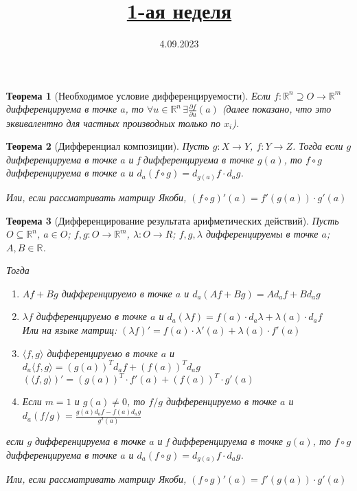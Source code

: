 \documentclass[11pt,a4paper,oneside]{scrartcl}
\title{\href{https://www.youtube.com/live/0p9G5WBcDqs?si=1_87BezxIHYyR8rZ}{1-ая неделя}}
\date{4.09.2023}
\newtheorem{theorem}{Теорема}
\begin{document}
\pagestyle{empty}

\maketitle

\begin{theorem}[Необходимое условие дифференцируемости]
    Если $f: \mathbb{R}^n \supseteq O \rightarrow \mathbb{R}^m$
    дифференцируема в точке $a$,
    то $\forall u \in \mathbb{R}^n \, \exists \frac{\partial f}{\partial u}(a)$
    (далее показано, что это эквивалентно для частных производных только по $x_i$).
\end{theorem}

\begin{theorem}[Дифференциал композиции]    %
    Пусть $g: X \rightarrow Y$, $f: Y \rightarrow Z$.
    Тогда если $g$ дифференцируема в точке $a$
    и f дифференцируема в точке $g(a)$,
    то $f \circ g$ дифференцируема в точке $a$
    и $d_a (f \circ g) = d_{g(a)} f \cdot d_a g$.

    Или, если рассматривать матрицу Якоби, $(f \circ g)'(a) = f'(g(a)) \cdot g'(a)$
\end{theorem}

\begin{theorem}[Дифференцирование результата арифметических действий]    %
    Пусть $O \subseteq \mathbb{R}^n$, $a \in O$;
    $f, g: O \rightarrow \mathbb{R}^m$, $\lambda: O \rightarrow R$;
    $f, g, \lambda$ дифференцируемы в точке $a$;
    $A, B \in \mathbb{R}$.

    Тогда \begin{enumerate}
              \item $Af + Bg$ дифференцируемо в точке $a$ и $d_a (Af + Bg) = Ad_a f + Bd_a g$
              \item $\lambda f$ дифференцируемо в точке $a$
                и $d_a (\lambda f) = f(a) \cdot d_a \lambda + \lambda(a) \cdot d_a f$ \\
                Или на языке матриц:
                    $(\lambda f)' = f(a) \cdot \lambda'(a) + \lambda(a) \cdot f'(a) $
              \item $\langle f, g \rangle$ дифференцируемо в точке $a$ и
                $d_a \langle f, g \rangle = (g(a))^T d_a f + (f(a))^T d_a g $ \\
                $(\langle f, g \rangle)' = (g(a))^T \cdot f'(a) + (f(a))^T \cdot g'(a)$
              \item Если $m = 1$ и $g(a) \neq 0$, то $f / g$ дифференцируемо в точке $a$
                и $d_a (f / g) = \frac{g(a)d_a f - f(a)d_a g}{g^2(a)}$
    \end{enumerate}
    если $g$ дифференцируема в точке $a$
    и f дифференцируема в точке $g(a)$,
    то $f \circ g$ дифференцируема в точке $a$
    и $d_a (f \circ g) = d_{g(a)} f \cdot d_a g$.

    Или, если рассматривать матрицу Якоби, $(f \circ g)'(a) = f'(g(a)) \cdot g'(a)$
\end{theorem}
\end{document}
